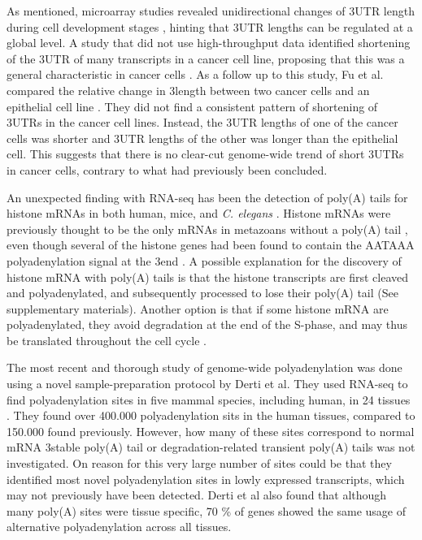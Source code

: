 As mentioned, microarray studies revealed unidirectional changes of 3\p UTR
length during cell development stages \cite{sandberg_proliferating_2008,
ji_progressive_2009}, hinting that 3\p UTR lengths can be regulated at a global
level. A study that did not use high-throughput data identified shortening of
the 3\p UTR of many transcripts in a cancer cell line, proposing that this was
a general characteristic in cancer cells \cite{mayr_widespread_2009-2}. As a
follow up to this study, Fu et al. compared the relative change in 3\p length
between two cancer cells and an epithelial cell line
\cite{fu_differential_2011}. They did not find a consistent pattern of
shortening of 3\p UTRs in the cancer cell lines. Instead, the 3\p UTR lengths
of one of the cancer cells was shorter and 3\p UTR lengths of the other was
longer than the epithelial cell. This suggests that there is no clear-cut
genome-wide trend of short 3\p UTRs in cancer cells, contrary to what had
previously been concluded.

An unexpected finding with RNA-seq has been the detection of poly(A) tails for
histone mRNAs in both human, mice, and \textit{C. elegans}
\cite{mangone_landscape_2010-1, shepard_complex_2011}.  Histone mRNAs were
previously thought to be the only mRNAs in metazoans without a poly(A) tail
\cite{marzluff_metabolism_2008}, even though several of the histone genes had
been found to contain the AATAAA polyadenylation signal at the 3\p end
\cite{keall_histone_2007}. A possible explanation for the discovery of histone
mRNA with poly(A) tails is that the histone transcripts are first cleaved and
polyadenylated, and subsequently processed to lose their poly(A) tail
\cite{mangone_landscape_2010-1} (See supplementary materials). Another option
is that if some histone mRNA are polyadenylated, they avoid degradation at the
end of the S-phase, and may thus be translated throughout the cell cycle
\cite{shepard_complex_2011}.

The most recent and thorough study of genome-wide polyadenylation was done
using a novel sample-preparation protocol by Derti et al. They used RNA-seq to
find polyadenylation sites in five mammal species, including human, in 24
tissues \cite{derti_quantitative_2012}. They found over 400.000 polyadenylation
sits in the human tissues, compared to 150.000 found previously. However, how
many of these sites correspond to normal mRNA 3\p stable poly(A) tail or
degradation-related transient poly(A) tails was not investigated. On reason for
this very large number of sites could be that they identified most novel
polyadenylation sites in lowly expressed transcripts, which may not previously
have been detected. Derti et al also found that although many poly(A) sites
were tissue specific, 70 \% of genes showed the same usage of alternative
polyadenylation across all tissues.

